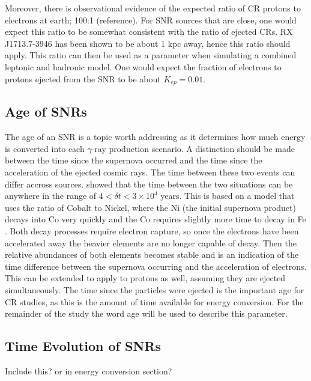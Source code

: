 \documentclass[12pt,a4paper]{article}
\begin{document}
Moreover, there is observational evidence of the expected ratio of CR protons to electrons at earth; 100:1 (reference). For SNR sources that are close, one would expect this ratio to be somewhat consistent with the ratio of ejected CRs. RX J1713.7-3946 has been shown to be about 1 kpc away, hence this ratio should apply. This ratio can then be used as a parameter when simulating a combined leptonic and hadronic model. One would expect the fraction of electrons to protons ejected from the SNR to be about $K_{ep} = 0.01$. \\

\subsection{Age of SNRs}
The age of an SNR is a topic worth addressing as it determines how much energy is converted into each $\gamma$-ray production scenario. A distinction should be made between the time since the supernova occurred and the time since the acceleration of the ejected cosmic rays. The time between these two events can differ accross sources. \cite{1990ApJ...348..608W} showed that the time between the two situations can be anywhere in the range of $4 < \delta t < 3\times 10^4$ years. This is based on a model that uses the ratio of Cobalt to Nickel, where the Ni (the initial supernova product) decays into Co very quickly and the Co requires slightly more time to decay in Fe \cite{1978ApJ...219..753S}. Both decay processes require electron capture, so once the electrons have been accelerated away the heavier elements are no longer capable of decay. Then the relative abundances of both elements becomes stable and is an indication of the time difference between the supernova occurring and the acceleration of electrons. This can be extended to apply to protons as well, assuming they are ejected simultaneously. The time since the particles were ejected is the important age for CR studies, as this is the amount of time available for energy conversion. For the remainder of the study the word age will be used to describe this parameter.\\

\subsection{Time Evolution of SNRs}
Include this? or in energy conversion section?
\end{document}

